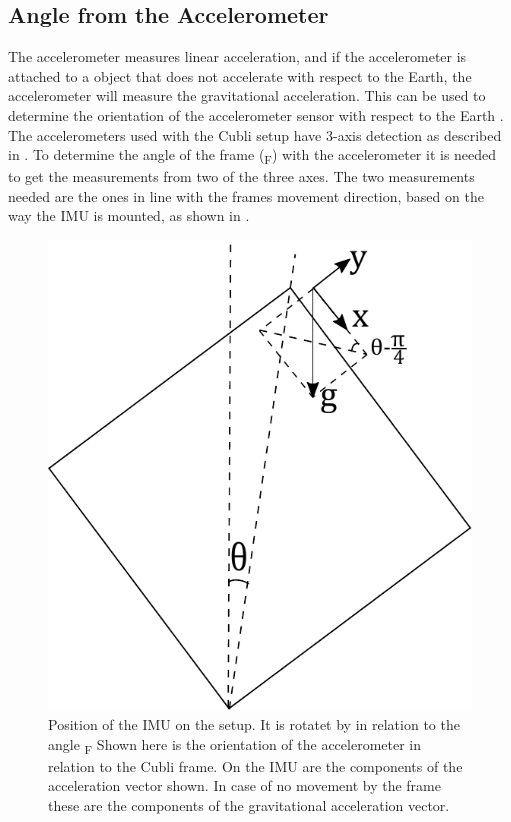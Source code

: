 \subsection{Angle from the Accelerometer}
The accelerometer measures linear acceleration, and if the accelerometer is attached to a object that does not accelerate with respect to the Earth, the accelerometer will measure the gravitational acceleration. This can be used to determine the orientation of the accelerometer sensor with respect to the Earth \cite{JWarren}.\\
The accelerometers used with the Cubli setup have 3-axis detection as described in . To determine the angle of the frame (\si{\theta_F}) with the accelerometer it is needed to get the measurements from two of the three axes. The two measurements needed are the ones in line with the frames movement direction, based on the way the IMU is mounted, as shown in . 
\begin{figure}[H]
	\centering
	\includegraphics[scale=0.6]{figures/accelerometer}
	\caption{Position of the IMU on the setup. It is rotatet by \si{} in relation to the angle \si{\theta_F} Shown here is the orientation of the accelerometer in relation to the Cubli frame. On the IMU are the components of the acceleration vector shown. In case of no movement by the frame these are the components of the gravitational acceleration vector.}
	\label{accelerometer}
\end{figure}\vspace{-5mm}
